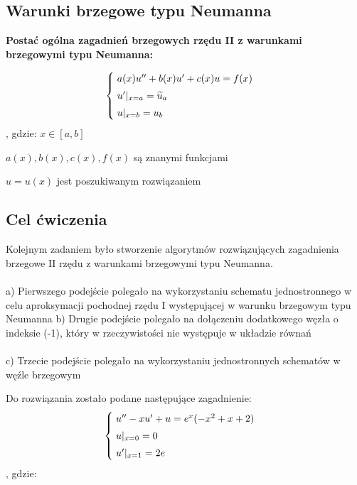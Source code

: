 \subsection{Warunki brzegowe typu Neumanna}
\textbf{Postać ogólna zagadnień brzegowych rzędu II z warunkami brzegowymi typu Neumanna:}

\[
\begin{cases}
\vspace{0.1cm} 
\hspace{0,1cm} a(x) u'' + b(x)u' + c(x)u =f(x) \\
\vspace{0.1cm}
\hspace{0,1cm}u'|_{x=a} = \widetilde{u}_{a} \\
\hspace{0,1cm}u|_{x=b} = u_{b}
\end{cases}
\]
, gdzie:
$x\in[a,b]$

$a(x), b(x), c(x), f(x)$ są znanymi funkcjami

$u = u(x)$ jest poszukiwanym rozwiązaniem
\newline

\subsection{Cel ćwiczenia}
Kolejnym zadaniem było stworzenie algorytmów rozwiązujących zagadnienia brzegowe II rzędu z warunkami brzegowymi typu Neumanna.
\\\\
a) Pierwszego podejście polegało na wykorzystaniu schematu jednostronnego w celu aproksymacji pochodnej rzędu I występującej w warunku brzegowym typu Neumanna
\newpage
b) Drugie podejście polegało na dołączeniu dodatkowego węzła o indeksie (-1), który w rzeczywistości nie występuje w układzie równań
\\\\
c) Trzecie podejście polegało na wykorzystaniu jednostronnych schematów w węźle brzegowym

Do rozwiązania zostało podane następujące zagadnienie:
\[
\begin{cases}
\vspace{0.1cm} 
\hspace{0,1cm}u''-xu' + u=e^x(-x^2+x+2) \\
\vspace{0.1cm}
\hspace{0,1cm}u|_{x=0}=0 \\
\hspace{0,1cm}u'|_{x=1}=2e
\end{cases}
\]
, gdzie:

